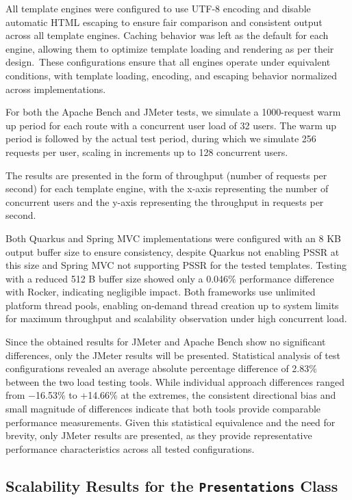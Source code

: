 \documentclass[software,article,accept,pdftex,moreauthors]{Definitions/mdpi}
\begin{document}
All template engines were configured to use UTF-8 encoding and disable
automatic HTML escaping to ensure fair comparison and consistent output across
all template engines. Caching behavior was left as the default for each
engine, allowing them to optimize template loading and rendering as per their
design.~These configurations ensure that all engines operate under equivalent
conditions, with template loading, encoding, and escaping behavior normalized
across implementations.

For both the Apache Bench and JMeter tests, we simulate a 1000-request warm up
period for each route with a concurrent user load of 32 users. The warm up
period is followed by the actual test period, during which we simulate 256
requests per user, scaling in increments up to 128 concurrent users.

The results are presented in the form of throughput (number of requests per
second) for each template engine, with the x-axis representing the number of
concurrent users and the y-axis representing the throughput in requests per
second.

Both Quarkus and Spring MVC implementations were configured with an 8 KB output
buffer size to ensure consistency, despite Quarkus not enabling PSSR at this
size and Spring MVC not supporting PSSR for the tested templates. Testing with
a reduced 512 B buffer size showed only a 0.046\% performance difference with
Rocker, indicating negligible impact. Both frameworks use unlimited platform
thread pools, enabling on-demand thread creation up to system limits for
maximum throughput and scalability observation under high concurrent load.

Since the obtained results for JMeter and Apache Bench show no significant
differences, only the JMeter results will be presented. Statistical analysis of
test configurations revealed an average absolute percentage difference of
2.83\% between the two load testing tools. While individual approach
differences ranged from $-$16.53\% to +14.66\% at the extremes, the consistent
directional bias and small magnitude of differences indicate that both tools
provide comparable performance measurements. Given this statistical equivalence
and the need for brevity, only JMeter results are presented, as they provide
representative performance characteristics across all tested configurations.

\subsection{Scalability Results for the \texttt{Presentations} Class} \label{sec:presentations-results}
\end{document}
